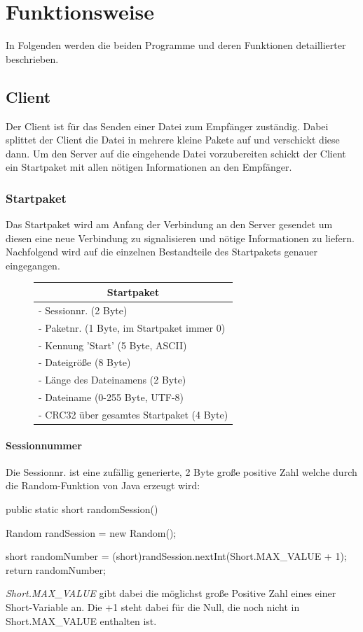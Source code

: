 \documentclass[a4paper, 12pt]{scrartcl}
\begin{document}
\section{Funktionsweise}
In Folgenden werden die beiden Programme und deren Funktionen detaillierter beschrieben.
\subsection{Client} \label{Client}
Der Client ist für das Senden einer Datei zum Empfänger zuständig. Dabei splittet der Client die Datei in mehrere kleine Pakete auf und verschickt diese dann. Um den Server auf die eingehende Datei vorzubereiten schickt der Client ein Startpaket mit allen nötigen Informationen an den Empfänger.
\subsubsection{Startpaket} \label{Startpaket}
Das Startpaket wird am Anfang der Verbindung an den Server gesendet um diesen eine neue Verbindung zu signalisieren und nötige Informationen zu liefern. Nachfolgend wird auf die einzelnen Bestandteile des Startpakets genauer eingegangen. 
\begin{figure}[h]
	\centering
		\begin{tabular}{|l|}
		\hline		
		\multicolumn{1}{|c|}{Startpaket}\\
		\hline \hline
		- Sessionnr. (2 Byte)\\
		- Paketnr.   (1 Byte, im Startpaket immer 0)\\
		- Kennung 'Start' (5 Byte, ASCII)\\
		- Dateigröße (8 Byte)\\
		- Länge des Dateinamens (2 Byte)\\
		- Dateiname (0-255 Byte, UTF-8)\\
		- CRC32 über gesamtes Startpaket (4 Byte)\\
		\hline
		\end{tabular}
\end{figure}
\paragraph{Sessionnummer}
Die Sessionnr. ist eine zufällig generierte, 2 Byte große positive Zahl welche durch die Random-Funktion von Java erzeugt wird:
\begin{javacode} 
public static short randomSession()
{
	Random randSession = new Random();
	    	
	short randomNumber = (short)randSession.nextInt(Short.MAX_VALUE + 1);
	return randomNumber;
}
\end{javacode}
\textit{Short.MAX\_VALUE} gibt dabei die möglichst große Positive Zahl eines einer Short-Variable an. Die +1 steht dabei für die Null, die noch nicht in Short.MAX\_VALUE enthalten ist.
\end{document}
